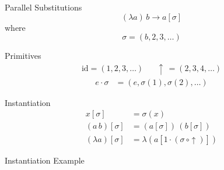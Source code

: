 \documentclass[17pt,aspectratio=169]{beamer}
\begin{document}
\begin{frame}{Parallel Substitutions}
    \[
        (\lambda a)\,b\longrightarrow a[\sigma]
    \]
    where
    \[
        \sigma = (b,2,3,\dots)
    \]
\end{frame}

\begin{frame}{Primitives}
    \begin{align*}
        \text{id}=(1,2,3,\dots) && \uparrow\,=(2,3,4,\dots)
    \end{align*}
    \vspace{1em}
    \begin{align*}
        e\cdot \sigma &= (e,\sigma(1),\sigma(2),\dots)
    \end{align*}
\end{frame}

\begin{frame}{Instantiation}
    \begin{align*}
        x[\sigma] &= \sigma(x) \\
        (a\,b)[\sigma] &= (a[\sigma])\,(b[\sigma]) \\
        (\lambda a)[\sigma] &= \lambda (a[1\cdot (\sigma\,\circ\uparrow)])
    \end{align*}
\end{frame}

\begin{frame}{Instantiation Example}
\end{frame}
\end{document}
